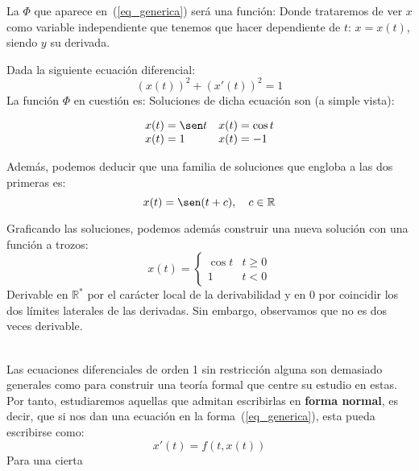 La $\Phi$ que aparece en~(\ref{eq_generica}) será una función:
Donde trataremos de ver $x$ como variable independiente que tenemos que hacer dependiente de $t$: $x=x(t)$, siendo $y$ su derivada.

\begin{ejemplo}
    Dada la siguiente ecuación diferencial:
    \begin{equation*}
        {(x(t))}^{2} + {(x'(t))}^{2} = 1
    \end{equation*}
    La función $\Phi$ en cuestión es:
    Soluciones de dicha ecuación son (a simple vista):

    \begin{equation*}
    \begin{array}{ll}
        x(t) = \sen t & x(t) = \cos t \\
        x(t) = 1 & x(t) = -1
    \end{array}
    \end{equation*}

    Además, podemos deducir que una familia de soluciones que engloba a las dos primeras es:
    \begin{equation*}
        x(t) = \sen(t+c), \quad c\in \mathbb{R}
    \end{equation*}


    Graficando las soluciones, podemos además construir una nueva solución con una función a trozos:
    \begin{equation*}
        x(t) = \left\{\begin{array}{ll}
                \cos t & t \geq 0 \\
                1 & t<0
        \end{array}\right.
    \end{equation*}
    Derivable en $\mathbb{R}^*$ por el carácter local de la derivabilidad y en 0 por coincidir los dos límites laterales de las derivadas. Sin embargo, observamos que no es dos veces derivable.
\end{ejemplo}~\\

Las ecuaciones diferenciales de orden 1 sin restricción alguna son demasiado generales como para construir una teoría formal que centre su estudio en estas. Por tanto, estudiaremos aquellas que admitan escribirlas en \textbf{forma normal}, es decir, que si nos dan una ecuación en la forma~(\ref{eq_generica}), esta pueda escribirse como:
\begin{equation}\label{eq_generica_normal}
    x'(t) = f(t,x(t))
\end{equation}
Para una cierta

